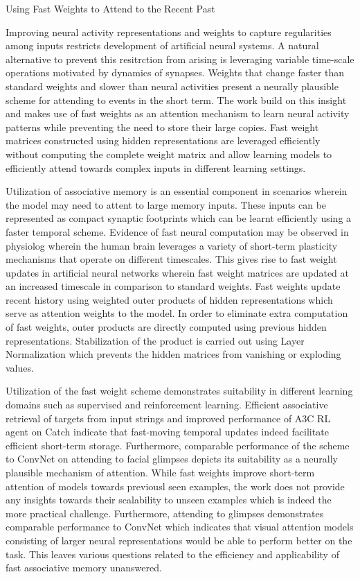 \documentclass[11pt,letterpaper]{article}
\begin{document}
\begin{center}
  \large{Using Fast Weights to Attend to the Recent Past}
\end{center}

Improving neural activity representations and weights to capture regularities among inputs restricts development of artificial neural systems. A natural alternative to prevent this resitrction from arising is leveraging variable time-scale operations motivated by dynamics of synapses. Weights that change faster than standard weights and slower than neural activities present a neurally plausible scheme for attending to events in the short term. The work build on this insight and makes use of fast weights as an attention mechanism to learn neural activity patterns while preventing the need to store their large copies. Fast weight matrices constructed using hidden representations are leveraged efficiently without computing the complete weight matrix and allow learning models to efficiently attend towards complex inputs in different learning settings.

Utilization of associative memory is an essential component in scenarios wherein the model may need to attent to large memory inputs. These inputs can be represented as compact synaptic footprints which can be learnt efficiently using a faster temporal scheme. Evidence of fast neural computation may be observed in physiolog wherein the human brain leverages a variety of short-term plasticity mechanisms that operate on different timescales. This gives rise to fast weight updates in artificial neural networks wherein fast weight matrices are updated at an increased timescale in comparison to standard weights. Fast weights update recent history using weighted outer products of hidden representations which serve as attention weights to the model. In order to eliminate extra computation of fast weights, outer products are directly computed using previous hidden representations. Stabilization of the product is carried out using Layer Normalization which prevents the hidden matrices from vanishing or exploding values. 

Utilization of the fast weight scheme demonstrates suitability in different learning domains such as supervised and reinforcement learning. Efficient associative retrieval of targets from input strings and improved performance of A3C RL agent on Catch indicate that fast-moving temporal updates indeed facilitate efficient short-term storage. Furthermore, comparable performance of the scheme to ConvNet on attending to facial glimpses depicts its suitability as a neurally plausible mechanism of attention. While fast weights improve short-term attention of models towards previousl seen examples, the work does not provide any insights towards their scalability to unseen examples which is indeed the more practical challenge. Furthermore, attending to glimpses demonstrates comparable performance to ConvNet which indicates that visual attention models consisting of larger neural representations would be able to perform better on the task. This leaves various questions related to the efficiency and applicability of fast associative memory unanswered. 
\end{document}
